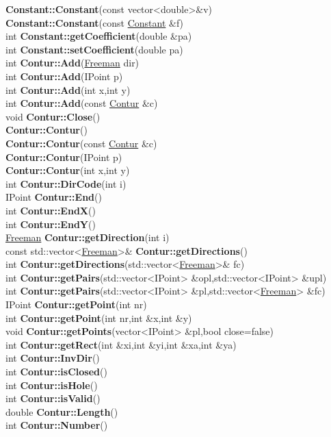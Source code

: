 \documentclass[10pt,titlepage]{article}
\def\functionlistentry#1#2#3#4#5#6{\noindent #1 {\bf #2}(#3) \dotfill #6\\}
\begin{document}
{{\functionlistentry{}{Constant::Constant}{const vector\textless {}double\textgreater  \&v}{999}{functions}{}
\functionlistentry{}{Constant::Constant}{const \hyperlink{Constant}{Constant} \&f}{1000}{functions}{}
\functionlistentry{int}{Constant::getCoefficient}{double \&pa}{1002}{functions}{}
\functionlistentry{int}{Constant::setCoefficient}{double pa}{1001}{functions}{}
\functionlistentry{int}{Contur::Add}{\hyperlink{Freeman}{Freeman} dir}{400}{conturs}{}
\functionlistentry{int}{Contur::Add}{IPoint p}{401}{conturs}{}
\functionlistentry{int}{Contur::Add}{int x,int y}{402}{conturs}{}
\functionlistentry{int}{Contur::Add}{const \hyperlink{Contur}{Contur} \&c}{403}{conturs}{}
\functionlistentry{void}{Contur::Close}{}{405}{conturs}{}
\functionlistentry{}{Contur::Contur}{}{391}{conturs}{}
\functionlistentry{}{Contur::Contur}{const \hyperlink{Contur}{Contur} \&c}{392}{conturs}{}
\functionlistentry{}{Contur::Contur}{IPoint p}{393}{conturs}{}
\functionlistentry{}{Contur::Contur}{int x,int y}{394}{conturs}{}
\functionlistentry{int}{Contur::DirCode}{int i}{425}{conturs}{}
\functionlistentry{IPoint}{Contur::End}{}{413}{conturs}{}
\functionlistentry{int}{Contur::EndX}{}{416}{conturs}{}
\functionlistentry{int}{Contur::EndY}{}{417}{conturs}{}
\functionlistentry{\hyperlink{Freeman}{Freeman}}{Contur::getDirection}{int i}{420}{conturs}{}
\functionlistentry{const std::vector\textless {}\hyperlink{Freeman}{Freeman}\textgreater {}\&}{Contur::getDirections}{}{421}{conturs}{}
\functionlistentry{int}{Contur::getDirections}{std::vector\textless {}\hyperlink{Freeman}{Freeman}\textgreater {}\& fc}{422}{conturs}{}
\functionlistentry{int}{Contur::getPairs}{std::vector\textless {}IPoint\textgreater {} \&opl,std::vector\textless {}IPoint\textgreater {} \&upl}{423}{conturs}{}
\functionlistentry{int}{Contur::getPairs}{std::vector\textless {}IPoint\textgreater {} \&pl,std::vector\textless {}\hyperlink{Freeman}{Freeman}\textgreater {} \&fc}{424}{conturs}{}
\functionlistentry{IPoint}{Contur::getPoint}{int nr}{426}{conturs}{}
\functionlistentry{int}{Contur::getPoint}{int nr,int \&x,int \&y}{427}{conturs}{}
\functionlistentry{void}{Contur::getPoints}{vector<IPoint> \&pl,bool close=false}{428}{conturs}{}
\functionlistentry{int}{Contur::getRect}{int \&xi,int \&yi,int \&xa,int \&ya}{419}{conturs}{}
\functionlistentry{int}{Contur::InvDir}{}{406}{conturs}{}
\functionlistentry{int}{Contur::isClosed}{}{411}{conturs}{}
\functionlistentry{int}{Contur::isHole}{}{418}{conturs}{}
\functionlistentry{int}{Contur::isValid}{}{408}{conturs}{}
\functionlistentry{double}{Contur::Length}{}{410}{conturs}{}
\functionlistentry{int}{Contur::Number}{}{409}{conturs}{}
}}
\end{document}
